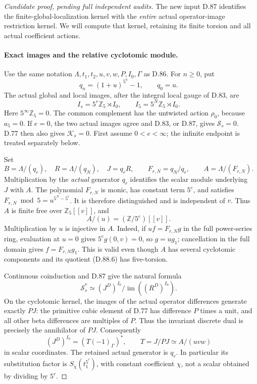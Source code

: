 \begin{proof}[Candidate proof, pending full independent audits]
The new input D.87 identifies the finite-global-localization
kernel with the \emph{entire} actual operator-image restriction
kernel. We will compute that kernel, retaining its finite
torsion and all actual coefficient actions.

\paragraph{Exact images and the relative cyclotomic module.}
Use the same notation \(\Lambda,t_1,t_2,u,v,w,P,I_0,\Gamma\)
as D.86. For \(n\ge0\), put
\[
                     q_n=(1+u)^{5^n}-1,
                     \qquad q_0=u.
\]
The actual global and local images, after the integral local
gauge of D.83, are
\[
 I_s=5^r\mathbb Z_5\rtimes I_0,
       \qquad I_5=5^N\mathbb Z_5\rtimes I_0.           \tag{D.88.4}
\]
Here \(5^\infty\mathbb Z_5=0\).
The common complement has the untwisted action \(\rho_0\),
because \(a_5=0\). If \(e=0\), the two actual images agree
and D.83, or D.87, gives \(\mathcal S_s=0\). D.77 then
also gives \(\mathcal K_s=0\). First assume \(0<e<\infty\);
the infinite endpoint is treated separately below.

Set
\[
 B=\Lambda/(q_r),\quad R=\Lambda/(q_N),\quad J=q_rR,
 \qquad F_{r,N}=q_N/q_r,
 \qquad A=\Lambda/(F_{r,N}).                           \tag{D.88.5}
\]
Multiplication by the \emph{actual} generator \(q_r\)
identifies the scalar module underlying \(J\) with \(A\).
The polynomial \(F_{r,N}\) is monic, has constant term
\(5^e\), and satisfies
\(F_{r,N}\bmod5=u^{5^N-5^r}\). It is therefore
distinguished and is independent of \(v\). Thus \(A\) is
finite free over \(\mathbb Z_5[[v]]\), and
\[
                     A/(u)=(\mathbb Z/5^e)[[v]].       \tag{D.88.6}
\]
Multiplication by \(u\) is injective in \(A\). Indeed,
if \(uf=F_{r,N}g\) in the full power-series ring, evaluation
at \(u=0\) gives \(5^e g(0,v)=0\), so \(g=ug_1\);
cancellation in the full domain gives \(f=F_{r,N}g_1\).
This is valid even though \(A\) has several cyclotomic
components and its quotient (D.88.6) has five-torsion.

Continuous coinduction and D.87 give the natural formula
\[
 \mathcal S_s^*\simeq
       (J^D)^{I_0}/\operatorname{im}((R^D)^{I_0}).       \tag{D.88.7}
\]
On the cyclotomic kernel, the images of the actual operator
differences generate exactly \(PJ\): the primitive cubic
element of D.77 has difference \(P\) times a unit, and all
other beta differences are multiples of \(P\). Thus the
invariant discrete dual is precisely the annihilator of
\(PJ\). Consequently
\[
 (J^D)^{I_0}=(T(-1)_\Gamma)^*,\qquad
             T=J/PJ\simeq A/(uvw)                    \tag{D.88.8}
\]
in scalar coordinates. The retained actual generator is
\(q_r\). In particular its substitution factor is
\(S_\chi(t_1^{5^r})\), with constant coefficient \(\chi\),
not a scalar obtained by dividing by \(5^r\).


\end{proof}
